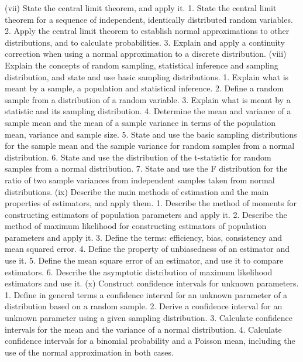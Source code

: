 (vii) State the central limit theorem, and apply it.  
 1. State the central limit theorem for a sequence of independent, identically distributed random variables.  
 2. Apply the central limit theorem to establish normal approximations to other distributions, and to calculate probabilities.  
 3. Explain and apply a continuity correction when using a normal approximation to a discrete distribution.  
(viii) Explain the concepts of random sampling, statistical inference and sampling distribution, and state and use basic sampling distributions.  
 1. Explain what is meant by a sample, a population and statistical inference.  
 2. Define a random sample from a distribution of a random variable.  
 3. Explain what is meant by a statistic and its sampling distribution.  
 4. Determine the mean and variance of a sample mean and the mean of a sample variance in terms of the population mean, variance and sample size.  
 5. State and use the basic sampling distributions for the sample mean and the sample variance for random samples from a normal distribution.  
 6. State and use the distribution of the t-statistic for random samples from a normal distribution.  
 7. State and use the F distribution for the ratio of two sample variances from independent samples taken from normal distributions.  
(ix) Describe the main methods of estimation and the main properties of estimators, and apply them.  
 1. Describe the method of moments for constructing estimators of population parameters and apply it.  
 2. Describe the method of maximum likelihood for constructing estimators of population parameters and apply it.  
 3. Define the terms: efficiency, bias, consistency and mean squared error.  
 4. Define the property of unbiasedness of an estimator and use it.  5. Define the mean square error of an estimator, and use it to compare estimators.  
 6. Describe the asymptotic distribution of maximum likelihood estimators and use it.  
(x) Construct confidence intervals for unknown parameters.  
 1. Define in general terms a confidence interval for an unknown parameter of a distribution based on a random sample.  
 2. Derive a confidence interval for an unknown parameter using a given sampling distribution.  
 3. Calculate confidence intervals for the mean and the variance of a normal distribution.  
 4. Calculate confidence intervals for a binomial probability and a Poisson mean, including the use of the normal approximation in both cases.  

